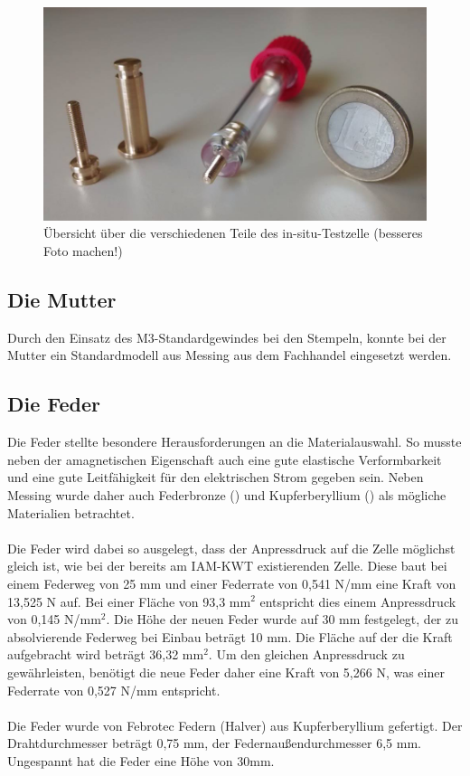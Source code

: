 \documentclass[a4paper, 11pt, headsepline,footsepline,twoside,abstract]{scrbook}
\begin{document}
\begin{figure}
	\centering
	\includegraphics[width=1.0\columnwidth]{images/Stempel_Foto_cutted.jpg}
	\caption{Übersicht über die verschiedenen Teile des in-situ-Testzelle (besseres Foto machen!)}
	\label{stempel_foto}
\end{figure}
\subsection{Die Mutter}
Durch den Einsatz des M3-Standardgewindes bei den Stempeln, konnte bei der Mutter ein Standardmodell aus Messing aus dem Fachhandel eingesetzt werden.
\subsection{Die Feder}
Die Feder stellte besondere Herausforderungen an die Materialauswahl. So musste neben der amagnetischen Eigenschaft auch eine gute elastische Verformbarkeit und eine gute Leitfähigkeit für den elektrischen Strom gegeben sein. Neben Messing wurde daher auch Federbronze () und Kupferberyllium () als mögliche Materialien betrachtet.
\\\\
Die Feder wird dabei so ausgelegt, dass der Anpressdruck auf die Zelle möglichst gleich ist, wie bei der bereits am IAM-KWT existierenden Zelle. Diese baut bei einem Federweg von 25 mm und einer Federrate von 0,541 N/mm eine Kraft von 13,525 N auf. Bei einer Fläche von 93,3 mm$^2$ entspricht dies einem Anpressdruck von 0,145 N/mm$^2$. Die Höhe der neuen Feder wurde auf 30 mm festgelegt, der zu absolvierende Federweg bei Einbau beträgt 10 mm. Die Fläche auf der die Kraft aufgebracht wird beträgt 36,32 mm$^2$. Um den gleichen Anpressdruck zu gewährleisten, benötigt die neue Feder daher eine Kraft von 5,266 N, was einer Federrate von 0,527 N/mm entspricht.
\\\\
Die Feder wurde von Febrotec Federn (Halver) aus Kupferberyllium gefertigt. Der Drahtdurchmesser beträgt 0,75 mm, der Federnaußendurchmesser 6,5 mm. Ungespannt hat die Feder eine Höhe von 30mm. %
\end{document}
